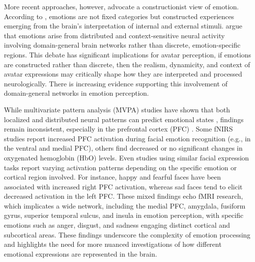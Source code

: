More recent approaches, however, advocate a constructionist view of emotion. 
According to \cite{barrett_solving_2006}, emotions are not fixed categories but constructed experiences emerging from the brain's interpretation of internal and external stimuli. 
\cite{lindquist_brain_2012} argue that emotions arise from distributed and context-sensitive neural activity involving domain-general brain networks rather than discrete, emotion-specific regions.
This debate has significant implications for avatar perception, if emotions are constructed rather than discrete, then the realism, dynamicity, and context of avatar expressions may critically shape how they are interpreted and processed neurologically.
There is increasing evidence supporting this involvement of domain-general networks in emotion perception. 

While multivariate pattern analysis (MVPA) studies have shown that both localized and distributed neural patterns can predict emotional states \citep{kragel_decoding_2016}, findings remain inconsistent, especially in the prefrontal cortex (PFC) \citep{westgarth_systematic_2021, bendall_brief_2016}.
Some fNIRS studies report increased PFC activation during facial emotion recognition (e.g., in the ventral and medial PFC), others find decreased or no significant changes in oxygenated hemoglobin (HbO) levels.
Even studies using similar facial expression tasks report varying activation patterns depending on the specific emotion or cortical region involved. 
For instance, happy and fearful faces have been associated with increased right PFC activation, whereas sad faces tend to elicit decreased activation in the left PFC. 
These mixed findings echo fMRI research, which implicates a wide network, including the medial PFC, amygdala, fusiform gyrus, superior temporal sulcus, and insula in emotion perception, with specific emotions such as anger, disgust, and sadness engaging distinct cortical and subcortical areas. 
These findings underscore the complexity of emotion processing and highlights the need for more nuanced investigations of how different emotional expressions are represented in the brain.

